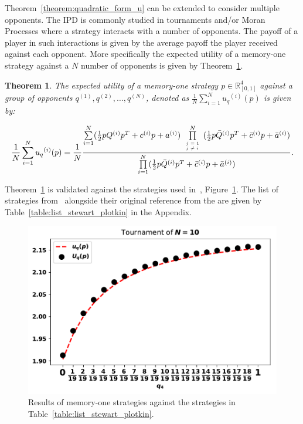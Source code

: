 \documentclass[10pt]{article}
\newtheorem{theorem}{Theorem}
\begin{document}
Theorem~\ref{theorem:quadratic_form_u} can be extended to consider multiple
opponents. The IPD is commonly studied in tournaments and/or Moran Processes
where a strategy interacts with a number of opponents. The payoff of a player in
such interactions is given by the average payoff the player received against
each opponent. More specifically the expected utility of a memory-one strategy
against a \(N\) number of opponents is given by
Theorem~\ref{theorem:tournament_utility}.

\begin{theorem}\label{theorem:tournament_utility}
    The expected utility of a memory-one strategy \(p\in\mathbb{R}_{[0,1]}^4\)
    against a group of opponents \(q^{(1)}, q^{(2)}, \dots, q^{(N)}\), denoted
    as \(\frac{1}{N} \sum\limits_{i=1} ^ {N} {u_q}^{(i)} (p)\) is given by:

    \begin{equation}\label{eq:tournament_utility}
        \frac{1}{N} \sum\limits_{i=1} ^ {N} {u_q}^{(i)} (p) = \frac{1}{N}
        \frac{\sum\limits_{i=1} ^ {N} (\frac{1}{2} pQ^{(i)} p^T + c^{(i)} p + a^ {(i)})
        \prod\limits_{\tiny\begin{array}{l} j=1 \\ j \neq i \end{array}} ^
        N (\frac{1}{2} p\bar{Q}^{(i)} p^T + \bar{c}^{(i)} p + \bar{a}^ {(i)})}
        {\prod\limits_{i=1} ^ N (\frac{1}{2} p\bar{Q}^{(i)} p^T + \bar{c}^{(i)} p + \bar{a}^ {(i)})}.
    \end{equation}
\end{theorem}

Theorem~\ref{theorem:tournament_utility} is validated against the strategies
used in~\cite{Stewart2012}, Figure~\ref{fig:stewart_plotkin_results}. The
list of strategies from~\cite{Stewart2012} alongside their original reference from the 
are given by Table~\ref{table:list_stewart_plotkin} in the Appendix.

\begin{figure}[!htbp]
    \begin{center}
    \includegraphics[width=.5\linewidth]{img/Stewart_tournament_results.pdf}
    \caption{Results of memory-one strategies against the strategies in
    Table~\ref{table:list_stewart_plotkin}.}
    \label{fig:stewart_plotkin_results}
    \end{center}
\end{figure}
\end{document}
